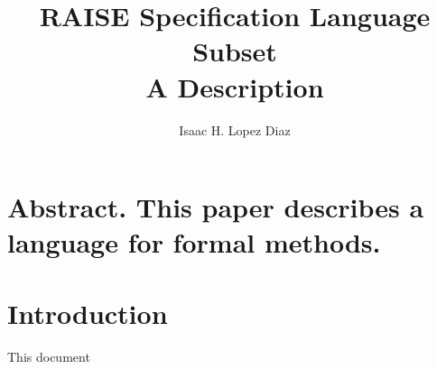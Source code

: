 \documentclass{article}
\title{RAISE Specification Language Subset \\ A Description}
\author{Isaac H. Lopez Diaz}
\begin{document}
\maketitle
\section*{Abstract. This paper describes a language for formal methods.}

\section{Introduction}
This document
\end{document}
